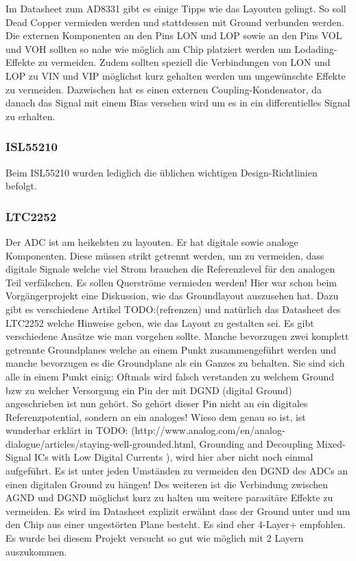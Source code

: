 Im Datasheet zum AD8331 gibt es einige Tipps wie das Layouten gelingt. So soll Dead Copper vermieden werden und stattdessen mit Ground verbunden werden.
Die externen Komponenten an den Pins LON und LOP sowie an den Pins VOL und VOH sollten so nahe wie möglich am Chip platziert werden um Lodading-Effekte zu vermeiden.
Zudem sollten speziell die Verbindungen von LON und LOP zu VIN und VIP möglichst kurz gehalten werden um ungewünschte Effekte zu vermeiden. Dazwischen hat es einen externen Coupling-Kondensator, da danach das Signal mit einem Bias versehen wird um es in ein differentielles Signal zu erhalten.

\subsubsection*{ISL55210}

Beim ISL55210 wurden lediglich die üblichen wichtigen Design-Richtlinien befolgt. 

\subsubsection*{LTC2252}

Der ADC ist am heikelsten zu layouten. Er hat digitale sowie analoge Komponenten. Diese müssen strikt getrennt werden, um zu vermeiden, dass digitale Signale welche viel Strom brauchen die Referenzlevel für den analogen Teil verfälschen. Es sollen Querströme vermieden werden!
Hier war schon beim Vorgängerprojekt eine Diskussion, wie das Groundlayout auszusehen hat. Dazu gibt es verschiedene Artikel TODO:(refrenzen) und natürlich das Datasheet des LTC2252 welche Hinweise geben, wie das Layout zu gestalten sei. Es gibt verschiedene Ansätze wie man vorgehen sollte. Manche bevorzugen zwei komplett getrennte Groundplanes welche an einem Punkt zusammengeführt werden und manche bevorzugen es die Groundplane als ein Ganzes zu behalten. Sie sind sich alle in einem Punkt einig: Oftmals wird falsch verstanden zu welchem Ground bzw zu welcher Versorgung ein Pin der mit DGND (digital Ground) angeschrieben ist nun gehört. So gehört dieser Pin nicht an ein digitales Referenzpotential, sondern an ein analoges! Wieso dem genau so ist, ist wunderbar erklärt in TODO: (http://www.analog.com/en/analog-dialogue/articles/staying-well-grounded.html, Grounding and Decoupling Mixed-Signal ICs with Low Digital Currents ), wird hier aber nicht noch einmal aufgeführt.
Es ist unter jeden Umständen zu vermeiden den DGND des ADCs an einen digitalen Ground zu hängen! Des weiteren ist die Verbindung zwischen AGND und DGND möglichst kurz zu halten um weitere parasitäre Effekte zu vermeiden.
Es wird im Datasheet explizit erwähnt dass der Ground unter und um den Chip aus einer ungestörten Plane besteht. Es sind eher 4-Layer+ empfohlen. Es wurde bei diesem Projekt versucht so gut wie möglich mit 2 Layern auszukommen.

